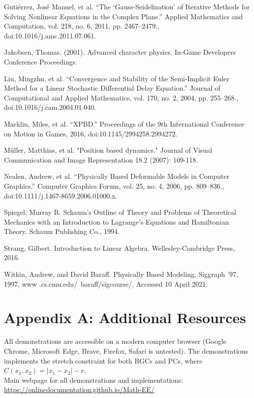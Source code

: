 \documentclass[12pt, letterpaper]{article}
\begin{document}
Gutiérrez, José Manuel, et al. “The ‘Gauss-Seidelization’ of Iterative Methods for Solving Nonlinear Equations in the Complex Plane.” Applied Mathematics and Computation, vol. 218, no. 6, 2011, pp. 2467–2479., doi:10.1016/j.amc.2011.07.061. 

Jakobsen, Thomas. (2001). Advanced character physics. In-Game Developers Conference Proceedings. 

Liu, Mingzhu, et al. “Convergence and Stability of the Semi-Implicit Euler Method for a Linear Stochastic Differential Delay Equation.” Journal of Computational and Applied Mathematics, vol. 170, no. 2, 2004, pp. 255–268., doi:10.1016/j.cam.2004.01.040. 

Macklin, Miles, et al. “XPBD.” Proceedings of the 9th International Conference on Motion in Games, 2016, doi:10.1145/2994258.2994272. 

Müller, Matthias, et al. "Position based dynamics." Journal of Visual Communication and Image Representation 18.2 (2007): 109-118.

Nealen, Andrew, et al. “Physically Based Deformable Models in Computer Graphics.” Computer Graphics Forum, vol. 25, no. 4, 2006, pp. 809–836., doi:10.1111/j.1467-8659.2006.01000.x.  

Spiegel, Murray R. Schaum's Outline of Theory and Problems of Theoretical Mechanics with an Introduction to Lagrange's Equations and Hamiltonian Theory. Schaum Publishing Co., 1994. 

Strang, Gilbert. Introduction to Linear Algebra. Wellesley-Cambridge Press, 2016. 

Witkin, Andrew, and David Baraff. Physically Based Modeling, Siggraph '97, 1997, www .cs.cmu.edu/~baraff/sigcourse/, Accessed 10 April 2021. 

\clearpage
\indent
\vspace{-2em}
\setlength{\parindent}{-0.5in}
\setlength{\leftskip}{0cm}

\section{Appendix A: Additional Resources}
All demonstrations are accessible on a modern computer browser (Google Chrome, Microsoft Edge, Brave, Firefox, Safari is untested). The demonstrations implements the stretch constraint for both RGCs and PCs, where $C(x_{1},x_{2}) = |x_{1}-x_{2}|-r$.\\

\noindent Main webpage for all demonstrations and implementations: 
\url{https://onlinedocumentation.github.io/Math-EE/}\\
\end{document}
